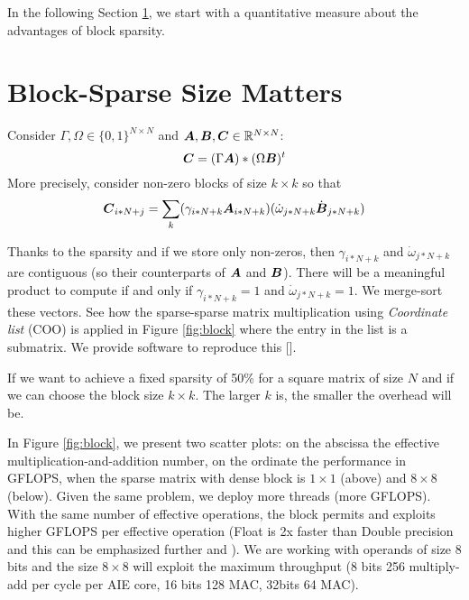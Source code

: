 \documentclass{IEEEtran}
\begin{document}
In the following Section \ref{sec:motivation}, we start with a
quantitative measure about the advantages of block sparsity.

\section{Block-Sparse Size Matters}
\label{sec:motivation}

Consider $\Gamma, \Omega \in \{0,1\}^{N\times N}$ and
${\boldsymbol A},{\boldsymbol B},{\boldsymbol C} \in \mathbb{R}^{N \times N}$:
\begin{equation}
  {\boldsymbol C} = (\Gamma {\boldsymbol A}) * (\Omega {\boldsymbol B})^t
\end{equation}
More precisely, consider non-zero blocks of size $k\times k$ so that
\begin{equation}
  {\boldsymbol C}_{i*N+j} = \sum_k ( \gamma_{i*N+k} {\boldsymbol A}_{i*N+k} ) (\dot{\omega}_{j*N+k} \dot{{\boldsymbol B}}_{j*N+k})
\end{equation}


Thanks to the sparsity and if we store only non-zeros, then
$\gamma_{i*N+k}$ and $\dot{\omega}_{j*N+k}$ are contiguous (so their counterparts of ${\boldsymbol A}$ and ${\boldsymbol B}$). There will
be a meaningful product to compute if and only if $\gamma_{i*N+k} =1$
and $\dot{\omega}_{j*N+k} =1$.  We merge-sort these vectors.  See how
the sparse-sparse matrix multiplication using {\em Coordinate list}
(COO) is applied in Figure \ref{fig:block} where the entry in the list
is a submatrix.  We provide software to reproduce this []. %

If we want to achieve a fixed sparsity of 50\% for a square matrix of
size $N$ and if we can choose the block size $k \times k$. The larger
$k$ is, the smaller the overhead will be.


In Figure \ref{fig:block}, we present two scatter plots: on the
abscissa the effective multiplication-and-addition number, on the
ordinate the performance in GFLOPS, when the sparse matrix with dense
block is $1\times 1$ (above) and $8\times8$ (below). Given the same
problem, we deploy more threads (more GFLOPS).  With the same number
of effective operations, the block permits and exploits higher GFLOPS
per effective operation (Float is 2x faster than Double precision and
this can be emphasized further \cite{Gray2017GPUKF,li2023popsparse}
and \cite{pmlr-v119-kurtz20a}). We are working with operands of size 8
bits and the size $8 \times 8$ will exploit the maximum throughput (8
bits 256 multiply-add per cycle per AIE core, 16 bits 128 MAC, 32bits
64 MAC).
\end{document}
